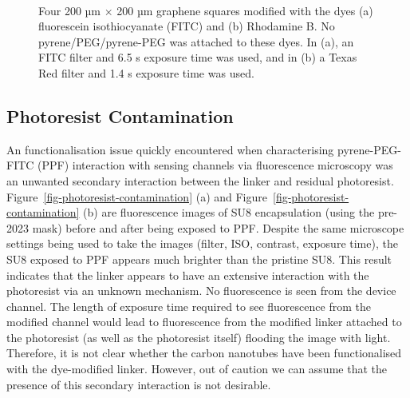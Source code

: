 \documentclass[
  a4paper,
]{scrbook}
\begin{document}
\begin{figure}
\begin{minipage}[t]{0.45\linewidth}
{{}

}

\end{minipage}%
%
\begin{minipage}[t]{0.01\linewidth}

{\centering 

~

}

\end{minipage}%

\caption{\label{fig-FITC-rhodamine-B}Four 200 µm \(\times\) 200 µm
graphene squares modified with the dyes (a) fluorescein isothiocyanate
(FITC) and (b) Rhodamine B. No pyrene/PEG/pyrene-PEG was attached to
these dyes. In (a), an FITC filter and 6.5 s exposure time was used, and
in (b) a Texas Red filter and 1.4 s exposure time was used.}

\end{figure}

\hypertarget{sec-photoresist-contamination}{%
\subsection{Photoresist
Contamination}\label{sec-photoresist-contamination}}

An functionalisation issue quickly encountered when characterising
pyrene-PEG-FITC (PPF) interaction with sensing channels via fluorescence
microscopy was an unwanted secondary interaction between the linker and
residual photoresist. Figure~\ref{fig-photoresist-contamination} (a) and
Figure~\ref{fig-photoresist-contamination} (b) are fluorescence images
of SU8 encapsulation (using the pre-2023 mask) before and after being
exposed to PPF. Despite the same microscope settings being used to take
the images (filter, ISO, contrast, exposure time), the SU8 exposed to
PPF appears much brighter than the pristine SU8. This result indicates
that the linker appears to have an extensive interaction with the
photoresist via an unknown mechanism. No fluorescence is seen from the
device channel. The length of exposure time required to see fluorescence
from the modified channel would lead to fluorescence from the modified
linker attached to the photoresist (as well as the photoresist itself)
flooding the image with light. Therefore, it is not clear whether the
carbon nanotubes have been functionalised with the dye-modified linker.
However, out of caution we can assume that the presence of this
secondary interaction is not desirable.
\end{document}
